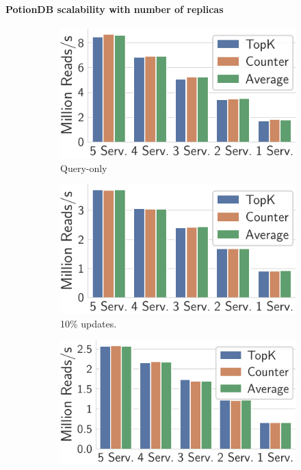 \documentclass[sigplan,review,anonymous]{acmart}
\begin{document}
\paragraph{PotionDB scalability with number of replicas}

\begin{figure}
	\centering
	\begin{subfigure}{.325\linewidth}
		\includegraphics[width=1\linewidth]{singleQuery/n_servers_0_upd_5b}
		\caption{Query-only}
		\label{fig:crdts_0_upd}
	\end{subfigure}%
	\begin{subfigure}{.325\linewidth}
		\includegraphics[width=1\linewidth]{singleQuery/n_servers_0_1_upd_5b}
		\caption{10\% updates.}
		\label{fig:crdts_10_upd}
	\end{subfigure}%
	\begin{subfigure}{.34\linewidth}
	\includegraphics[width=1\linewidth]{singleQuery/n_servers_0_25_upd_5b}

\end{subfigure}
\end{figure}
\end{document}
